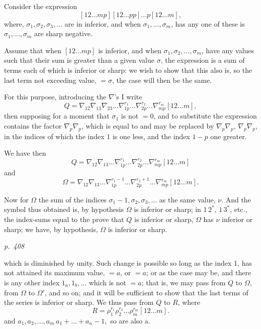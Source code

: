 \documentclass[11pt,a4paper]{book}
\begin{document}
Consider the expression
\[
[12 \ldots m p] [12 \ldots p p] \ldots p[12 \ldots m],
\]
where, $\sigma_1, \sigma_2, \sigma_3, \ldots$ are in inferior, and when $\sigma_1, \ldots, \sigma_m$, has any one of these is $\sigma_1, \ldots, \sigma_m$
are sharp negative.

Assume that when $[12 \ldots m p]$ is inferior, and when $\sigma_1, \sigma_2, \ldots, \sigma_m$, have any values such
that their sum is greater than a given value $\sigma$, the expression is a sum of
terms each of which is inferior or sharp: we wish to show that this also is, so the
last term not exceeding value, $= \sigma$, the case will then be the same.

For this purpose, introducing the $\nabla$'s I write
\[
Q = \nabla_{12} \nabla_{13} \nabla_{23} \ldots \nabla_{1p}^{r_1} \ldots \nabla_{2p}^{r_2} \ldots \nabla_{mp}^{r_m} [12 \ldots m],
\]
then supposing for a moment that $\sigma_1$ is not $= 0$, and to substitute the expression
contains the factor $\nabla_p \nabla_p$, which is equal to and may be replaced by $\nabla_p \nabla_p$, $\nabla_p \nabla_p$,
in the indices of which the index 1 is one less, and the index $1 - p$ one greater.

We have then
\[
Q = \nabla_{12} \nabla_{13} \ldots \nabla_{1p}^{r_1} \ldots \nabla_{2p}^{r_2} \ldots \nabla_{mp}^{r_m} [12 \ldots m]
\]
and
\[
\Omega = \nabla_{12} \nabla_{13} \ldots \nabla_{1p}^{r_1 - 1} \ldots \nabla_{2p}^{r_2 + 1} \ldots \nabla_{mp}^{r_m} [12 \ldots m].
\]

Now for $\Omega$ the sum of the indices $\sigma_1 - 1, \sigma_2, \sigma_3, \ldots$ as the same value, $\nu$.  And the symbol thus obtained
is, by hypothesis $\Omega$ is inferior or sharp; in $1\,2^*$, $1\,3^*$, etc., the index-sums equal to the
prove that $Q$ is inferior or sharp, $\Omega$ has $\nu$ inferior or sharp; we have, by hypothesis,
$\Omega$ is inferior or sharp.

\clearpage

\bigskip
\textit{p.~408}
\smallskip

\noindent
which is diminished by unity.  Such change is possible so long as the index 1, has
not attained its maximum value, $= a$, or $= a$; or as the case may be, and there is any
other index $1_a, 1_b, \ldots$ which is not $= a$; that is, we may pass from $Q$ to $\Omega$, from
$\Omega$ to $\Omega'$, and so on; and it will be sufficient to show that the last terms of the
series is inferior or sharp.  We thus pass from $Q$ to $R$, where
\[
R = \rho_1^{r_1} \rho_2^{r_2} \ldots \rho_m^{r_m} [12 \ldots m].
\]
and $a_1, a_2, \ldots, a_m \,a_1 + \ldots + a_n - 1, $ so are also a.
\end{document}
